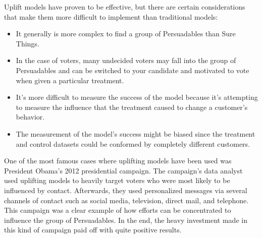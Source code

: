 \documentclass{article}
\begin{document}
\begin{enumerate}[label=(\alph*)]
\begin{enumerate}[label=\arabic*.]
Uplift models have proven to be effective, but there are certain considerations that make them more difficult to implement than traditional models: 
\begin{itemize}
    \item It generally is more complex to find a group of Persuadables than Sure Things.
    \item In the case of voters, many undecided voters may fall into the group of Persuadables and can be switched to your candidate and motivated to vote when given a particular treatment.
    \item It's more difficult to measure the success of the model because it's attempting to measure the influence that the treatment caused to change a customer's behavior.
    \item The measurement of the model's success might be biased since the treatment and control datasets could be conformed by completely different customers. 
\end{itemize}

One of the most famous cases where uplifting models have been used was President Obama's 2012 presidential campaign. The campaign's data analyst used uplifting models to heavily target voters who were most likely to be influenced by contact. Afterwards, they used personalized messages via several channels of contact such as social media, television, direct mail, and telephone. This campaign was a clear example of how efforts can be concentrated to influence the group of Persuadables. In the end, the heavy investment made in this kind of campaign paid off with quite positive results.\\


\end{enumerate}
\end{enumerate}
\end{document}
